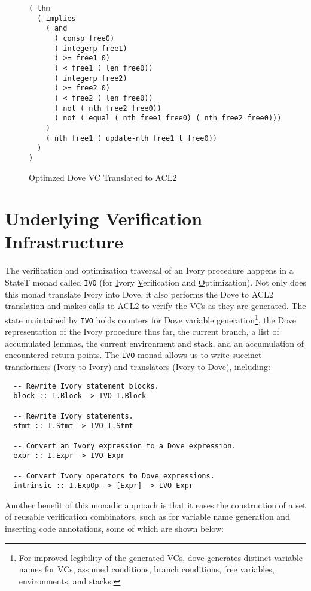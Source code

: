 \documentclass{article}
\begin{document}
\begin{figure}
  \caption{Optimzed Dove VC Translated to ACL2}
  \label{fig:openValveAVC1ACL2}
  \begin{lstlisting}
( thm
  ( implies
    ( and
      ( consp free0)
      ( integerp free1)
      ( >= free1 0)
      ( < free1 ( len free0))
      ( integerp free2)
      ( >= free2 0)
      ( < free2 ( len free0))
      ( not ( nth free2 free0))
      ( not ( equal ( nth free1 free0) ( nth free2 free0)))
    )
    ( nth free1 ( update-nth free1 t free0))
  )
)
  \end{lstlisting}
\end{figure}

\section{Underlying Verification Infrastructure}

The verification and optimization traversal
of an Ivory procedure happens in a StateT monad called \texttt{IVO}
(for \underline{I}vory \underline{V}erification and \underline{O}ptimization).
Not only does this monad translate Ivory into Dove, it also performs the Dove to ACL2
translation and makes calls to ACL2 to verify the VCs as they are generated.
The state maintained by \texttt{IVO} holds
counters for Dove variable generation\footnote{For improved legibility of the generated VCs,
dove generates distinct variable names
for VCs, assumed conditions, branch conditions, free variables,
environments, and stacks.},
the Dove representation of the Ivory procedure thus far,
the current branch,
a list of accumulated lemmas,
the current environment and stack, and an accumulation
of encountered return points.
The \texttt{IVO} monad allows us to write
succinct transformers (Ivory to Ivory) and translators (Ivory to Dove),
including:

\begin{lstlisting}
  -- Rewrite Ivory statement blocks.
  block :: I.Block -> IVO I.Block
  
  -- Rewrite Ivory statements.
  stmt :: I.Stmt -> IVO I.Stmt
  
  -- Convert an Ivory expression to a Dove expression.
  expr :: I.Expr -> IVO Expr
  
  -- Convert Ivory operators to Dove expressions.
  intrinsic :: I.ExpOp -> [Expr] -> IVO Expr
\end{lstlisting}

Another benefit of this monadic approach is that it
eases the construction of a set of reusable verification combinators,
such as for variable name generation and inserting code annotations, 
some of which are shown below:
\end{document}
